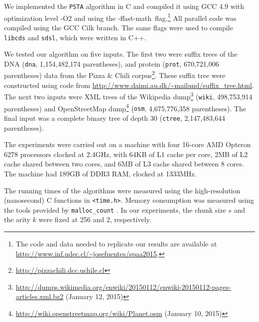 We implemented the {\tt PSTA} algorithm in C and compiled it using GCC 4.9 with
optimization level -O2 and using the \mbox{-ffast-math flag}.\footnote{The code
  and data needed to replicate our results are available at
  \url{http://www.inf.udec.cl/~josefuentes/spaa2015}.}
All parallel code was compiled using the GCC Cilk branch.
The same flags were used to compile {\tt libcds} and {\tt sdsl}, which were
written in C++.

We tested our algorithm on five inputs.
The first two were suffix trees of the DNA ({\tt dna}, 1,154,482,174
parentheses), and protein ({\tt prot}, 670,721,006 parentheses) data from the
Pizza \& Chili corpus\footnote{\url{http://pizzachili.dcc.uchile.cl}}.
These suffix tree were constructed using code from
\url{http://www.daimi.au.dk/~mailund/suffix_tree.html}.
The next two inputs were XML trees of the Wikipedia
dump\footnote{\url{http://dumps.wikimedia.org/enwiki/20150112/enwiki-20150112-pages-articles.xml.bz2} (January 12, 2015)}
({\tt wiki}, 498,753,914 parentheses) and OpenStreetMap
dump\footnote{\url{http://wiki.openstreetmap.org/wiki/Planet.osm} (January 10,
  2015)} ({\tt osm}, 4,675,776,358 parentheses).
The final input was a complete binary tree of depth 30 ({\tt ctree},
2,147,483,644 parentheses).

The experiments were carried out on a machine with four 16-core AMD
Opteron\texttrademark{} 6278 processors clocked at 2.4GHz,
with 64KB of L1 cache per core, 2MB of L2 cache shared
between two cores, and 6MB of L3 cache shared between 8 cores.
The machine had 189GB of DDR3 RAM, clocked at 1333MHz.

The running times of the algorithms were measured using
the high-resolution (nanosecond) C functions in {\tt <time.h>}.
Memory consumption was measured using the tools provided by
{\tt malloc\_count} \cite{malloc-count}.
In our experiments, the chunk size $s$ and the arity $k$ were fixed at 256 and
2, respectively.
